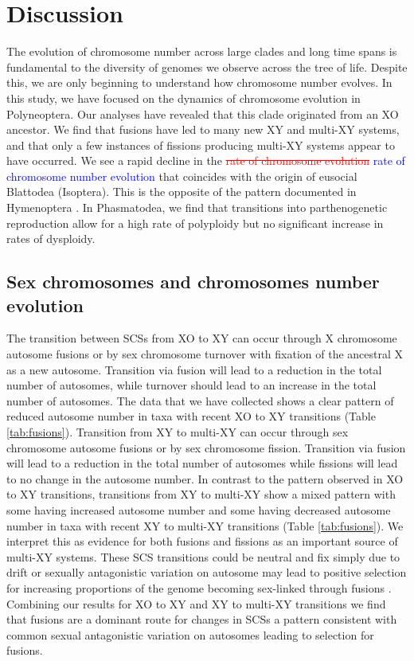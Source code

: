 \documentclass[]{rsos}%
\begin{document}
\section{Discussion}

The evolution of chromosome number across large clades and long time spans is fundamental to the diversity of genomes we observe across the tree of life.
Despite this, we are only beginning to understand how chromosome number evolves.
In this study, we have focused on the dynamics of chromosome evolution in Polyneoptera. 
Our analyses have revealed that this clade originated from an XO ancestor. 
We find that fusions have led to many new XY and multi-XY systems, and that only a few instances of fissions producing multi-XY systems appear to have occurred.
We see a rapid decline in the \textcolor{red}{\st{rate of chromosome evolution}} \textcolor{blue}{rate of chromosome number evolution} that coincides with the origin of eusocial Blattodea (Isoptera).
This is the opposite of the pattern documented in Hymenoptera \cite{ross2015}.
In Phasmatodea, we find that transitions into parthenogenetic reproduction allow for a high rate of polyploidy but no significant increase in rates of dysploidy.

\subsection{Sex chromosomes and chromosomes number evolution}
The transition between SCSs from XO to XY can occur through X chromosome autosome fusions or by sex chromosome turnover with fixation of the ancestral X
as a new autosome\textcolor{blue}{\cite{charlesworth1980, white1973}}.
Transition via fusion will lead to a reduction in the total number of autosomes, while turnover should lead to an increase in the total number of autosomes.
The data that we have collected shows a clear pattern of reduced autosome number in taxa with recent XO to XY transitions (Table \ref{tab:fusions}).
Transition from XY to multi-XY can occur through sex chromosome autosome fusions or by sex chromosome fission.
Transition via fusion will lead to a reduction in the total number of autosomes while fissions will lead to no change in the autosome number.
In contrast to the pattern observed in XO to XY transitions, transitions from XY to multi-XY show a mixed pattern with some having increased autosome number and some having decreased autosome number in taxa with recent XY to multi-XY transitions (Table \ref{tab:fusions}).
We interpret this as evidence for both fusions and fissions as an important source of multi-XY systems.
These SCS transitions could be neutral and fix simply due to drift or sexually antagonistic variation on autosome may lead to positive selection for increasing proportions of the genome becoming sex-linked through fusions \cite{charlesworth1980, kitano2012}.
Combining our results for XO to XY and XY to multi-XY transitions we find that fusions are a dominant route for changes in SCSs a pattern consistent with common sexual antagonistic variation on autosomes leading to selection for fusions. 
\end{document}
